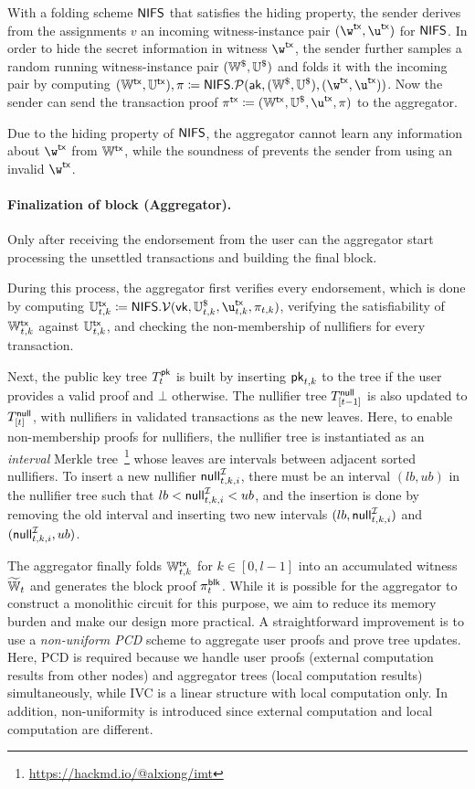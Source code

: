 With a folding scheme $\mathsf{NIFS}$ that satisfies the hiding property, the sender derives from the assignments $v$ an incoming witness-instance pair $(\w^\Tx, \u^\Tx)$ for $\mathsf{NIFS}$.
In order to hide the secret information in witness $\w^\Tx$, the sender further samples a random running witness-instance pair $({\mathbb{W}}^\$, {\mathbb{U}}^\$)$ and folds it with the incoming pair by computing $(\W^\Tx, \U^\Tx), \pi \coloneqq \NIFSProve(\Ak, (\W^\$, \U^\$), (\w^\Tx, \u^\Tx))$.
Now the sender can send the transaction proof $\pi^\Tx \coloneqq (\W^\Tx, \U^\$, \u^\Tx, \pi)$ to the aggregator.

Due to the hiding property of $\mathsf{NIFS}$, the aggregator cannot learn any information about $\w^\Tx$ from ${\mathbb{W}}^\mathsf{tx}$, while the soundness of \NIFS prevents the sender from using an invalid $\w^\Tx$.

\paragraph{Finalization of block (Aggregator).}

Only after receiving the endorsement from the user can the aggregator start processing the unsettled transactions and building the final block.

During this process, the aggregator first verifies every endorsement, which is done by computing $\U^\Tx_{t, k} \coloneqq \NIFSVerify(\Vk, \U^\$_{t, k}, \u^\Tx_{t, k}, \pi_{t, k})$, verifying the satisfiability of ${\mathbb{W}}^\mathsf{tx}_{t, k}$ against ${\mathbb{U}}^\mathsf{tx}_{t, k}$, and checking the non-membership of nullifiers for every transaction.

Next, the public key tree $T^{\mathsf{pk}}_{t}$ is built by inserting ${\mathsf{pk}}_{t, k}$ to the tree if the user provides a valid proof and $\bot$ otherwise.
The nullifier tree $T^\mathsf{null}_{[t - 1]}$ is also updated to $T^\mathsf{null}_{[t]}$, with nullifiers in validated transactions as the new leaves.
Here, to enable non-membership proofs for nullifiers, the nullifier tree is instantiated as an \textit{interval} Merkle tree~\footnote{\url{https://hackmd.io/@alxiong/imt}} whose leaves are intervals between adjacent sorted nullifiers.
To insert a new nullifier $\mathsf{null}^\mathcal{I}_{t, k, i}$, there must be an interval $(lb, ub)$ in the nullifier tree such that $lb < \mathsf{null}^\mathcal{I}_{t, k, i} < ub$, and the insertion is done by removing the old interval and inserting two new intervals $(lb, \mathsf{null}^\mathcal{I}_{t, k, i})$ and $(\mathsf{null}^\mathcal{I}_{t, k, i}, ub)$.

The aggregator finally folds ${\mathbb{W}}^\mathsf{tx}_{t, k}$ for $k \in [0, l - 1]$ into an accumulated witness $\widetilde{{\mathbb{W}}}_t$ and generates the block proof $\pi^\mathsf{blk}_t$.
While it is possible for the aggregator to construct a monolithic circuit for this purpose, we aim to reduce its memory burden and make our design more practical.
A straightforward improvement is to use a \textit{non-uniform \ac{PCD}} scheme to aggregate user proofs and prove tree updates.
Here, \ac{PCD} is required because we handle user proofs (external computation results from other nodes) and aggregator trees (local computation results) simultaneously, while \ac{IVC} is a linear structure with local computation only.
In addition, non-uniformity is introduced since external computation and local computation are different.

